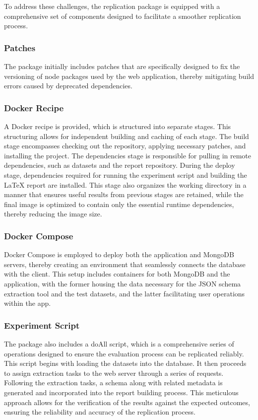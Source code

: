 \documentclass[sigconf, nonacm]{acmart}
\begin{document}
To address these challenges, the replication package is equipped with a comprehensive set of components designed to facilitate a smoother replication process.

\subsubsection{Patches}

The package initially includes patches that are specifically designed to fix the versioning of node packages used by the web application, thereby mitigating build errors caused by deprecated dependencies.

\subsubsection{Docker Recipe}

A Docker recipe is provided, which is structured into separate stages. This structuring allows for independent building and caching of each stage. The build stage encompasses checking out the repository, applying necessary patches, and installing the project. The dependencies stage is responsible for pulling in remote dependencies, such as datasets and the report repository. During the deploy stage, dependencies required for running the experiment script and building the LaTeX report are installed. This stage also organizes the working directory in a manner that ensures useful results from previous stages are retained, while the final image is optimized to contain only the essential runtime dependencies, thereby reducing the image size.

\subsubsection{Docker Compose}

Docker Compose is employed to deploy both the application and MongoDB servers, thereby creating an environment that seamlessly connects the database with the client. This setup includes containers for both MongoDB and the application, with the former housing the data necessary for the JSON schema extraction tool and the test datasets, and the latter facilitating user operations within the app.

\subsubsection{Experiment Script}

The package also includes a doAll script, which is a comprehensive series of operations designed to ensure the evaluation process can be replicated reliably. This script begins with loading the datasets into the database. It then proceeds to assign extraction tasks to the web server through a series of requests. Following the extraction tasks, a schema along with related metadata is generated and incorporated into the report building process. This meticulous approach allows for the verification of the results against the expected outcomes, ensuring the reliability and accuracy of the replication process.
\end{document}
